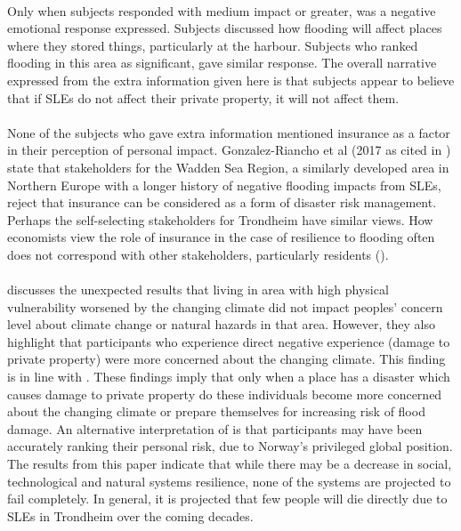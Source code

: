 \paragraph{}
Only when subjects responded with medium impact or greater, was a negative emotional response expressed. Subjects discussed how flooding will affect places where they stored things, particularly at the harbour. Subjects who ranked flooding in this area as significant, gave similar response. The overall narrative expressed from the extra information given here is that subjects appear to believe that if SLEs do not affect their private property, it will not affect them. 
\paragraph{}
None of the subjects who gave extra information mentioned insurance as a factor in their perception of personal impact.  Gonzalez-Riancho et al (2017 as cited in \cite{gerkensmeier_governing_2018}) state that stakeholders for the Wadden Sea Region, a similarly developed area in Northern Europe with a longer history of negative flooding impacts from SLEs, reject that insurance can be considered as a form of disaster risk management. Perhaps the self-selecting stakeholders for Trondheim have similar views. How economists view the role of insurance in the case of resilience to flooding often does not correspond with other stakeholders, particularly residents (\cite{gerkensmeier_governing_2018}).
\paragraph{}

\cite{lujala_climate_2015} discusses the unexpected results that living in area with high physical vulnerability worsened by the changing climate did not impact peoples' concern level about climate change or natural hazards in that area. However, they also highlight that participants who experience direct negative experience (damage to private property) were more concerned about the changing climate. This finding is in line with \cite{whitmarsh_are_2008}. These findings imply that only when a place has a disaster which causes damage to private property do these individuals become more concerned about the changing climate or prepare themselves for increasing risk of flood damage. An alternative interpretation of \cite{lujala_climate_2015} is that participants may have been accurately ranking their personal risk, due to Norway's privileged global position. The results from this paper indicate that while there may be a decrease in social, technological and natural systems resilience, none of the systems are projected to fail completely. In general, it is projected that few people will die directly due to SLEs in Trondheim over the coming decades.
